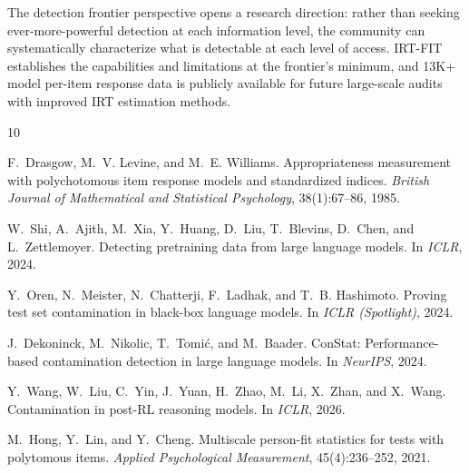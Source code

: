 \documentclass[11pt,a4paper]{article}
\begin{document}
The detection frontier perspective opens a research direction: rather than seeking ever-more-powerful detection at each information level, the community can systematically characterize what is detectable at each level of access.
IRT-FIT establishes the capabilities and limitations at the frontier's minimum, and 13K+ model per-item response data is publicly available for future large-scale audits with improved IRT estimation methods.



\begin{thebibliography}{10}

F.~Drasgow, M.~V. Levine, and M.~E. Williams.
\newblock Appropriateness measurement with polychotomous item response models and standardized indices.
\newblock \emph{British Journal of Mathematical and Statistical Psychology}, 38(1):67--86, 1985.

W.~Shi, A.~Ajith, M.~Xia, Y.~Huang, D.~Liu, T.~Blevins, D.~Chen, and L.~Zettlemoyer.
\newblock Detecting pretraining data from large language models.
\newblock In \emph{ICLR}, 2024.

Y.~Oren, N.~Meister, N.~Chatterji, F.~Ladhak, and T.~B. Hashimoto.
\newblock Proving test set contamination in black-box language models.
\newblock In \emph{ICLR (Spotlight)}, 2024.

J.~Dekoninck, M.~Nikolic, T.~Tomi\'{c}, and M.~Baader.
\newblock ConStat: Performance-based contamination detection in large language models.
\newblock In \emph{NeurIPS}, 2024.

Y.~Wang, W.~Liu, C.~Yin, J.~Yuan, H.~Zhao, M.~Li, X.~Zhan, and X.~Wang.
\newblock Contamination in post-RL reasoning models.
\newblock In \emph{ICLR}, 2026.

M.~Hong, Y.~Lin, and Y.~Cheng.
\newblock Multiscale person-fit statistics for tests with polytomous items.
\newblock \emph{Applied Psychological Measurement}, 45(4):236--252, 2021.

\end{thebibliography}
\end{document}
